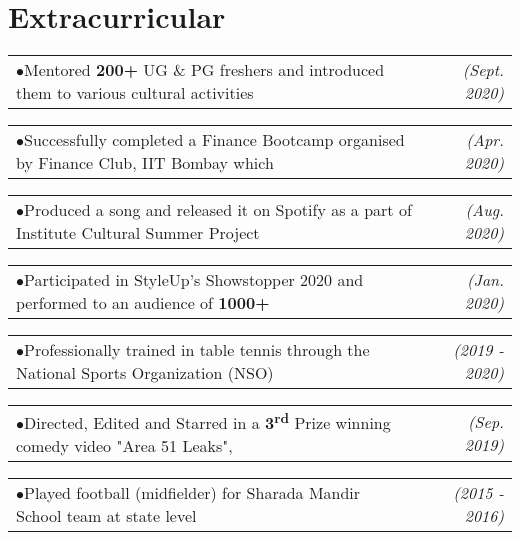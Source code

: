 \documentclass[a4paper,11pt]{article}
\makeatletter
\newcommand{\extracurr}[2]{
    \begin{tabular*}{0.977\textwidth}{l@{\extracolsep{\fill}}r}
        \tiny{$\bullet$}\hspace{7pt}\small{#1} & \textit{\small{#2}} \\
    \end{tabular*}\vspace{-11pt}
}
\makeatother
\begin{document}
\section{Extracurricular}
\begin{adjustwidth}{10.8pt}{}
	\extracurr{Mentored \textbf{200+} UG \& PG freshers and introduced them to various cultural activities}{(Sept. 2020)}
	  
	\extracurr{Successfully completed a Finance Bootcamp organised by Finance Club, IIT Bombay which}{(Apr. 2020)}
	\vspace{-2pt} \hspace{3.75mm}{\small taught and tested the knowledge of Financial Statements, Capital Markets \& Ratio Analysis}
	\vspace{2pt}
	  
	\extracurr{Produced a song and released it on Spotify as a part of Institute Cultural Summer Project}{(Aug. 2020)}
	  
	\extracurr{Participated in StyleUp's Showstopper 2020 and performed to an audience of \textbf{1000+}}{(Jan. 2020)}
	  
	\extracurr{Professionally trained in table tennis through the National Sports Organization (NSO)} {(2019 - 2020)}
	  
	\extracurr{Directed, Edited and Starred in a \textbf{3\textsuperscript{rd}} Prize winning comedy video "Area 51 Leaks",}{(Sep. 2019)}
	  
	\vspace{-2pt} \hspace{3.75mm}{made as an entry for the freshmen festival (Freshiezza)}
	  
	\vspace{2pt}
	\extracurr{Played football (midfielder) for Sharada Mandir School team at state level}{(2015 - 2016)}
	
\end{adjustwidth}
\end{document}
